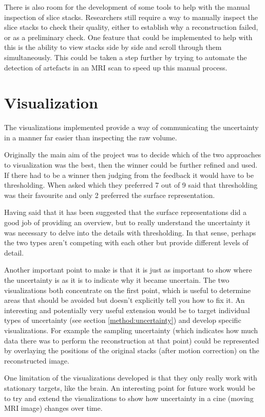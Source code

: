 There is also room for the development of some tools to help with the manual inspection of slice stacks. Researchers still require a way to manually inspect the slice stacks to check their quality, either to establish why a reconstruction failed, or as a preliminary check. One feature that could be implemented to help with this is the ability to view stacks side by side and scroll through them simultaneously. This could be taken a step further by trying to automate the detection of artefacts in an MRI scan to speed up this manual process.

\section{Visualization}
The visualizations implemented provide a way of communicating the uncertainty in a manner far easier than inspecting the raw volume.

Originally the main aim of the project was to decide which of the two approaches to visualization was the best, then the winner could be further refined and used. If there had to be a winner then judging from the feedback it would have to be thresholding. When asked which they preferred 7 out of 9 said that thresholding was their favourite and only 2 preferred the surface representation.

Having said that it has been suggested that the surface representations did a good job of providing an overview, but to really understand the uncertainty it was necessary to delve into the details with thresholding. In that sense, perhaps the two types aren't competing with each other but provide different levels of detail.

Another important point to make is that it is just as important to show where the uncertainty is as it is to indicate why it became uncertain. The two visualizations both concentrate on the first point, which is useful to determine areas that should be avoided but doesn't explicitly tell you how to fix it. An interesting and potentially very useful extension would be to target individual types of uncertainty (see section \ref{method:uncertainty}) and develop specific visualizations. For example the sampling uncertainty (which indicates how much data there was to perform the reconstruction at that point) could be represented by overlaying the positions of the original stacks (after motion correction) on the reconstructed image.

One limitation of the visualizations developed is that they only really work with stationary targets, like the brain. An interesting point for future work would be to try and extend the visualizations to show how uncertainty in a cine (moving MRI image) changes over time.

